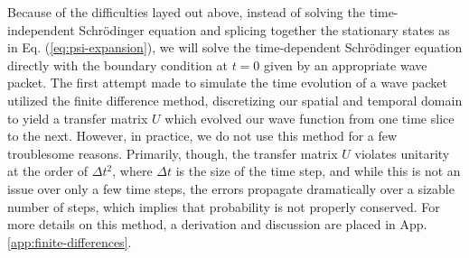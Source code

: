 Because of the difficulties layed out above, instead of solving the time-independent Schr\"{o}dinger equation and splicing together the stationary states as in Eq. (\ref{eq:psi-expansion}), we will solve the time-dependent Schr\"{o}dinger equation directly with the boundary condition at $t = 0$ given by an appropriate wave packet.
The first attempt made to simulate the time evolution of a wave packet utilized the finite difference method, discretizing our spatial and temporal domain to yield a transfer matrix $U$ which evolved our wave function from one time slice to the next.
However, in practice, we do not use this method for a few troublesome reasons.
Primarily, though, the transfer matrix $U$ violates unitarity at the order of $\Delta t^2$, where $\Delta t$ is the size of the time step, and while this is not an issue over only a few time steps, the errors propagate dramatically over a sizable number of steps, which implies that probability is not properly conserved.
For more details on this method, a derivation and discussion are placed in App. \ref{app:finite-differences}.

